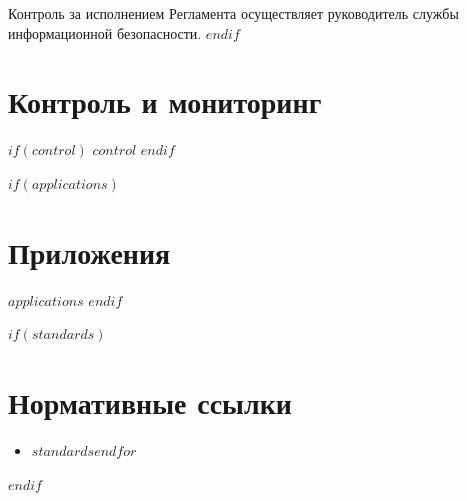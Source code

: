 \documentclass[14pt,a4paper]{extarticle}
\begin{document}
Контроль за исполнением Регламента осуществляет руководитель службы информационной безопасности.
$endif$

\section{Контроль и мониторинг}
\label{sec:control}

$if(control)$
$control$
$endif$

$if(applications)$
\newpage
\appendix
\section*{Приложения}
$applications$
$endif$

$if(standards)$
\newpage
\section*{Нормативные ссылки}
\begin{itemize}
$for(standards)$\item $standards$$endfor$
\end{itemize}
$endif$
\end{document}
